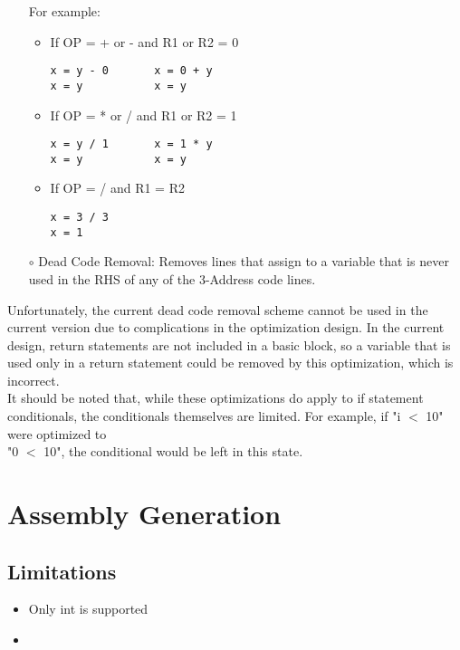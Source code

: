 \documentclass{scrartcl}
\begin{document}
\begin{itemize}
For example:
\begin{itemize}
\item If OP = + or - and R1 or R2 = 0
\begin{verbatim}
x = y - 0       x = 0 + y
x = y           x = y
\end{verbatim}
\item If OP = * or / and R1 or R2 = 1
\begin{verbatim}
x = y / 1       x = 1 * y
x = y           x = y
\end{verbatim}
\item If OP = / and R1 = R2
\begin{verbatim}
x = 3 / 3
x = 1
\end{verbatim}
\end{itemize}
\item[$\circ$] Dead Code Removal: Removes lines that assign to a variable that is never used in the RHS of any of the 3-Address code lines.
\end{itemize}

Unfortunately, the current dead code removal scheme cannot be used in the current version due to complications in the optimization design.
In the current design, return statements are not included in a basic block, so a variable that is used only in a return statement could be
removed by this optimization, which is incorrect. \\

It should be noted that, while these optimizations do apply to if statement conditionals, the conditionals themselves are limited.
For example, if "i $<$ 10" were optimized to \\
"0 $<$ 10", the conditional would be left in this state.

\section{Assembly Generation}
\subsection{Limitations}
\begin{itemize}
    \item Only int is supported
    \item %
\end{itemize}
\end{document}

